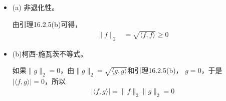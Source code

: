 \documentclass{article}
\begin{document}
\begin{itemize}
  \item (a) 非退化性。

        由引理16.2.5(b)可得，
        \begin{align*}
          \|f\|_2 & = \sqrt{\langle f, f \rangle} \geq 0
        \end{align*}

  \item (b)柯西-施瓦茨不等式。

        如果$\|g\|_2 = 0$，由$\|g\|_2 = \sqrt{\langle g, g \rangle}$和引理16.2.5(b)，
        $g = 0$，于是$|\langle f, g \rangle| = 0$，所以
        \begin{align*}
          |\langle f, g \rangle| = \|f\|_2\|g\|_2 = 0
        \end{align*}


\end{itemize}
\end{document}
